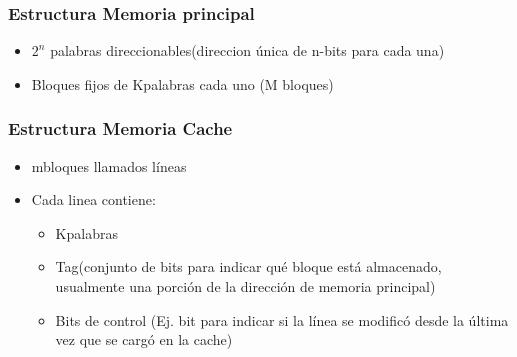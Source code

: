 \subsubsection{Estructura Memoria principal}
	\begin{itemize}
	\item $2^n$ palabras direccionables(direccion única de n-bits para cada una)
	\item Bloques fijos de Kpalabras cada uno (M bloques)
	\end{itemize}
\subsubsection{Estructura Memoria Cache}
	\begin{itemize}
	\item mbloques llamados líneas
	\item Cada linea contiene:
		\begin{itemize}
		\item Kpalabras
		\item Tag(conjunto de bits para indicar qué bloque está almacenado, usualmente una porción de la dirección de memoria principal)
		\item Bits de control (Ej. bit para indicar si la línea se modificó desde la última vez que se cargó en la cache)
		\end{itemize}
	\end{itemize}